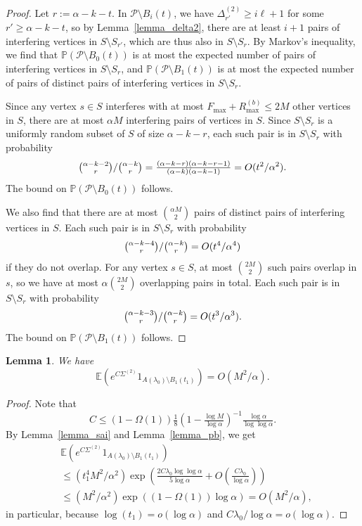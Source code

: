 \documentclass{article}
\theoremstyle{plain}
\theoremstyle{remark}
\theoremstyle{plain}
\newtheorem{lemma}[theorem]{Lemma}
\numberwithin{equation}{section}
\begin{document}
	\begin{proof}
		Let $r:=\alpha-k-t$. In $\mathcal{P}\setminus B_i(t)$, we have $\Delta_{r'}^{(2)}\geq i\ell+1$ for some $r'\geq\alpha-k-t$, so by Lemma~\ref{lemma_delta2}, there are at least $i+1$ pairs of interfering vertices in $S\setminus S_{r'}$, which are thus also in $S\setminus S_r$. By Markov's inequality, we find that $\mathbb{P}(\mathcal{P}\setminus B_0(t))$ is at most the expected number of pairs of interfering vertices in $S\setminus S_r$, and $\mathbb{P}(\mathcal{P}\setminus B_1(t))$ is at most the expected number of pairs of distinct pairs of interfering vertices in $S\setminus S_r$.
		
		Since any vertex $s\in S$ interferes with at most $F_{\max}+R_{\max}^{(b)}\leq2M$ other vertices in $S$, there are at most $\alpha M$ interfering pairs of vertices in $S$. Since $S\setminus S_r$ is a uniformly random subset of $S$ of size $\alpha-k-r$, each such pair is in $S\setminus S_r$ with probability $$\tbinom{\alpha-k-2}r/\tbinom{\alpha-k}r=\tfrac{(\alpha-k-r)(\alpha-k-r-1)}{(\alpha-k)(\alpha-k-1)}=O(t^2/\alpha^2).$$ The bound on $\mathbb{P}(\mathcal{P}\setminus B_0(t))$ follows.
		
		We also find that there are at most $\binom{\alpha M}{2}$ pairs of distinct pairs of interfering vertices in $S$. Each such pair is in $S\setminus S_r$ with probability $$\tbinom{\alpha-k-4}r/\tbinom{\alpha-k}r=O(t^4/\alpha^4)$$ if they do not overlap. For any vertex $s\in S$, at most $\binom{2M}{2}$ such pairs overlap in $s$, so we have at most $\alpha\binom{2M}{2}$ overlapping pairs in total. Each such pair is in $S\setminus S_r$ with probability $$\tbinom{\alpha-k-3}r/\tbinom{\alpha-k}r=O(t^3/\alpha^3).$$ The bound on $\mathbb{P}(\mathcal{P}\setminus B_1(t))$ follows.
	\end{proof}
	
	\begin{lemma}\label{lemma_b1}
		We have $$\mathbb{E}(e^{C\Sigma^{(2)}}1_{A(\lambda_0)\setminus B_1(t_1)})=O(M^2/\alpha).$$
	\end{lemma}
	
	\begin{proof}
		Note that $$C\leq(1-\Omega(1))\tfrac1{8}\left(1-\tfrac{\log M}{\log\alpha}\right)^{-1}\tfrac{\log\alpha}{\log\log\alpha}.$$ By Lemma~\ref{lemma_sai} and Lemma~\ref{lemma_pb}, we get
		\begin{align}
			&\mathbb{E}(e^{C\Sigma^{(2)}}1_{A(\lambda_0)\setminus B_1(t_1)})
			\\&\leq(t_1^4M^2/\alpha^2)\exp\left(\tfrac{2C\lambda_0\log\log\alpha}{5\log\alpha}+O\left(\tfrac{C\lambda_0}{\log\alpha}\right)\right)
			\\&\leq(M^2/\alpha^2)\exp\left((1-\Omega(1))\log\alpha\right)=O(M^2/\alpha),
		\end{align}
		in particular, because $\log(t_1)=o(\log\alpha)$ and $C\lambda_0/\log\alpha=o(\log\alpha)$.
	\end{proof}
	
\end{document}
